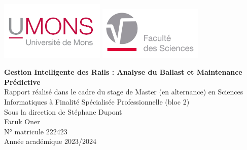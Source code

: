\thispagestyle{empty}
\begin{center}
    \includegraphics[width=5cm]{images/umons.png}
    \hspace{90.0pt}
    \includegraphics[width=5cm]{images/FS.png}	    
\end{center}
\vspace{4cm}	                               
\begin{center}	                              
    {\huge \bf Gestion Intelligente des Rails : Analyse du Ballast et Maintenance Prédictive}\\                        
    \vspace{3cm}
    \large Rapport réalisé dans le cadre du stage de  Master (en alternance) en Sciences Informatiques à Finalité Spécialisée Professionnelle (bloc 2) \\
    \vspace{1cm}
   Sous la direction de Stéphane Dupont\\
    \vspace{3cm}
    Faruk Oner  \\
    N° matricule 222423 \\

    \vfill	                                   
    Année académique 2023/2024
\end{center}
